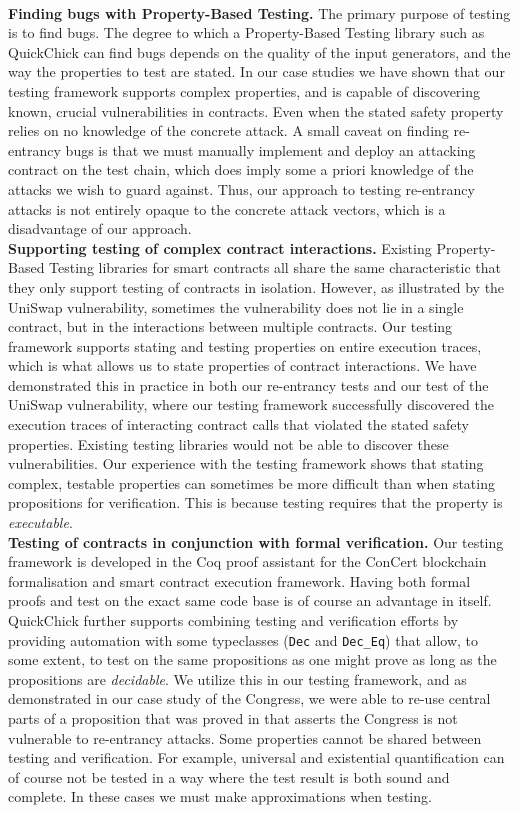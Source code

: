 \documentclass[twoside,11pt,openright]{report}
\newcommand{\pbt}{Property-Based Testing}
\newcommand{\cc}{ConCert}
\newcommand{\coq}[1]{\texttt{#1}}
\begin{document}
\medskip\\
\textbf{Finding bugs with \pbt{}.} The primary purpose of testing is to find bugs. The degree to which a \pbt{} library such as QuickChick can find bugs depends on the quality of the input generators, and the way the properties to test are stated. In our case studies we have shown that our testing framework supports complex properties, and is capable of discovering known, crucial vulnerabilities in contracts. Even when the stated safety property relies on no knowledge of the concrete attack. A small caveat on finding re-entrancy bugs is that we must manually implement and deploy an attacking contract on the test chain, which does imply some a priori knowledge of the attacks we wish to guard against. Thus, our approach to testing re-entrancy attacks is not entirely opaque to the concrete attack vectors, which is a disadvantage of our approach. 
\medskip\\
\textbf{Supporting testing of complex contract interactions.} Existing \pbt{} libraries for smart contracts all share the same characteristic that they only support testing of contracts in isolation. However, as illustrated by the UniSwap vulnerability, sometimes the vulnerability does not lie in a single contract, but in the interactions between multiple contracts. Our testing framework supports stating and testing properties on entire execution traces, which is what allows us to state properties of contract interactions. We have demonstrated this in practice in both our re-entrancy tests and our test of the UniSwap vulnerability, where our testing framework successfully discovered the execution traces of interacting contract calls that violated the stated safety properties. Existing testing libraries would not be able to discover these vulnerabilities. Our experience with the testing framework shows that stating complex, testable properties can sometimes be more difficult than when stating propositions for verification. This is because testing requires that the property is \textit{executable}. 
\medskip\\
\textbf{Testing of contracts in conjunction with formal verification.}
Our testing framework is developed in the Coq proof assistant for the \cc{} blockchain formalisation and smart contract execution framework. Having both formal proofs and test on the exact same code base is of course an advantage in itself. QuickChick further supports combining testing and verification efforts by providing automation with some typeclasses (\coq{Dec} and \coq{Dec\_Eq}) that allow, to some extent, to test on the same propositions as one might prove as long as the propositions are \textit{decidable}. We utilize this in our testing framework, and as demonstrated in our case study of the Congress, we were able to re-use central parts of a proposition that was proved in \cite{nielsen2019smart} that asserts the Congress is not vulnerable to re-entrancy attacks. Some properties cannot be shared between testing and verification. For example, universal and existential quantification can of course not be tested in a way where the test result is both sound and complete. In these cases we must make approximations when testing.
\end{document}

